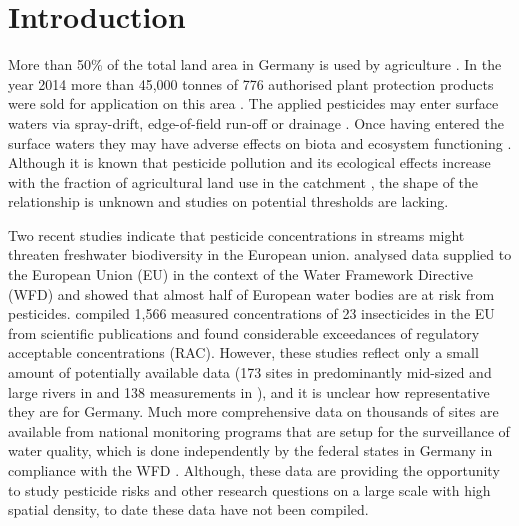 \documentclass[journal=esthag,manuscript=article]{achemso}
\begin{document}



\section{Introduction}
More than 50\% of the total land area in Germany is used by agriculture \citep{statistisches_bundesamt_bodenflache_2014}.
In the year 2014 more than 45,000 tonnes of 776 authorised plant protection products were sold for application on this area \citep{bundesamt_fur_verbraucherschutz_und_lebensmittelsicherheit_absatz_2015}.
The applied pesticides may enter surface waters via spray-drift, edge-of-field run-off or drainage \citep{stehle_probabilistic_2013,schulz_comparison_2001,liess_determination_1999}.
Once having entered the surface waters they may have adverse effects on biota and ecosystem functioning \citep{schafer_thresholds_2012}. 
Although it is known that pesticide pollution and its ecological effects increase with the fraction of agricultural land use in the catchment \citep{schulz_field_2004}, the shape of the relationship is unknown and studies on potential thresholds are lacking.

Two recent studies indicate that pesticide concentrations in streams might threaten freshwater biodiversity in the European union.
\citet{malaj_organic_2014} analysed data supplied to the European Union (EU) in the context of the Water Framework Directive (WFD) and showed that almost half of European water bodies are at risk from pesticides.
\citet{stehle_pesticide_2015} compiled 1,566 measured concentrations of 23 insecticides in the EU from scientific publications and found considerable exceedances of regulatory acceptable concentrations (RAC).
However, these studies reflect only a small amount of potentially available data (173 sites in predominantly mid-sized and large rivers in \citet{malaj_organic_2014} and 138 measurements in \citet{stehle_pesticide_2015}), and it is unclear how representative they are for Germany. %
Much more comprehensive data on thousands of sites are available from national monitoring programs that are setup for the surveillance of water quality,
which is done independently by the federal states in Germany in compliance with the WFD \citep{quevauviller_water_2008}. 
Although, these data are providing the opportunity to study pesticide risks and other research questions on a large scale with high spatial density, to date these data have not been compiled.
\end{document}
